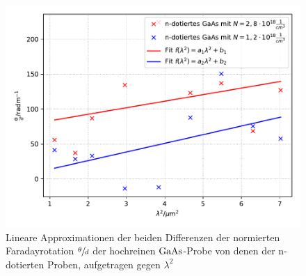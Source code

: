 \begin{figure}[H]
    \centering
    \includegraphics[scale=0.7]{content/plot3.pdf}
    \caption{Lineare Approximationen der beiden Differenzen der normierten Faradayrotation $\sfrac{\theta}{d}$ 
              der hochreinen $\ce{GaAs}$-Probe von denen der n-dotierten Proben, aufgetragen gegen $\lambda^2$}
    \label{fig:plot3}
  \end{figure}

        
        
        
        
        


  
 
  


 
 

